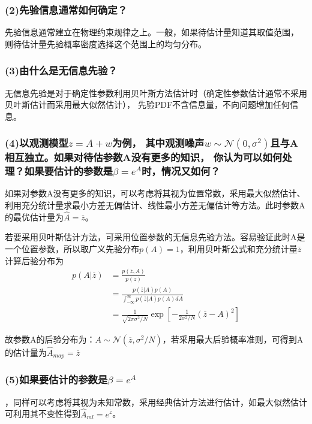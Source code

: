 \documentclass[fontset=windows]{article}
\numberwithin{figure}{section}
\begin{document}
\subsubsection*{(2)先验信息通常如何确定？}

先验信息通常建立在物理约束规律之上。一般，如果待估计量知道其取值范围，
则待估计量先验概率密度选择这个范围上的均匀分布。

\subsubsection*{(3)由什么是无信息先验？}

无信息先验是对于确定性参数利用贝叶斯方法估计时（确定性参数估计通常不采用贝叶斯估计而采用最大似然估计），
先验PDF不含信息量，不向问题增加任何信息。

\subsubsection*{(4)以观测模型\(z=A+w\)为例，
	其中观测噪声\(w\sim \mathcal{N}(0,\sigma^2)\)且与A相互独立。如果对待估参数A没有更多的知识，
	你认为可以如何处理？如果要估计的参数是\(\beta=e^A\)时，情况又如何？}

如果对参数A没有更多的知识，可以考虑将其视为位置常数，采用最大似然估计、利用充分统计量求最小方差无偏估计、线性最小方差无偏估计等方法。此时参数A的最优估计量为\(\hat{A}=\overline{z}\)。

若要采用贝叶斯估计方法，可采用位置参数的无信息先验方法。容易验证此时A是一个位置参数，所以取广义先验分布\(p(A)=1\)，利用贝叶斯公式和充分统计量\(\overline{z}\)计算后验分布为
\begin{align*}
	p(A|\overline{z})
	 & =\frac{p(\overline{z},A)}{p(\overline{z})}                                                 \\
	 & =\frac{p(\overline{z}|A)p(A)}{\int_{-\infty}^{\infty}p(\overline{z}|A)p(A)dA}              \\
	 & =\frac{1}{\sqrt{2\pi \sigma^2/N}}\exp\left[-\frac{1}{2\sigma^2/N}(\overline{z}-A)^2\right]
\end{align*}

故参数A的后验分布为：\(A\sim \mathcal{N}(\overline{z},\sigma^2/N)\)，若采用最大后验概率准则，可得到A的估计量为\(\hat{A}_{map}=\overline{z}\)

\subsubsection*{(5)如果要估计的参数是\(\beta=e^A\)}，同样可以考虑将其视为未知常数，采用经典估计方法进行估计，如最大似然估计可利用其不变性得到\(\hat{A}_{ml}=e^{\overline{z}}\)。
\end{document}
